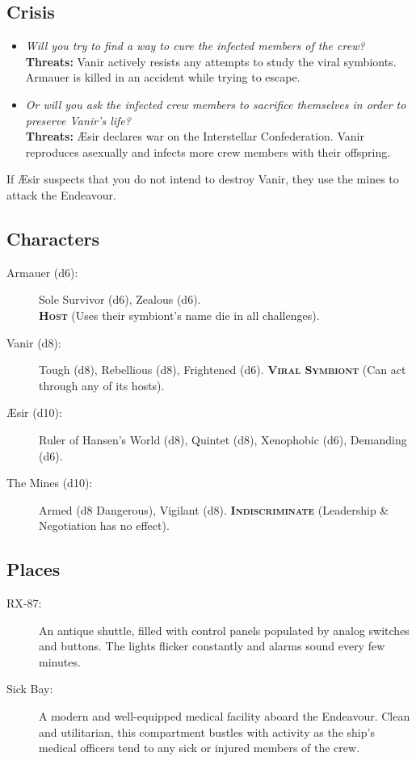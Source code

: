 \documentclass[11pt, a5paper, parskip=half-, DIV=12]{scrartcl}
\begin{document}
\subsection*{Crisis}

\begin{itemize}
	\item \textit{Will you try to find a way to cure the infected members of the crew?} \textbf{Threats:} Vanir actively resists any attempts to study the viral symbionts.  Armauer is killed in an accident while trying to escape.
	\item \textit{Or will you ask the infected crew members to sacrifice themselves in order to preserve Vanir's life?} \\ \textbf{Threats:} \AE{}sir declares war on the Interstellar Confederation. Vanir reproduces asexually and infects more crew members with their offspring.
\end{itemize}

If \AE{}sir suspects that you do not intend to destroy Vanir, they use the mines to attack the Endeavour.
\newpage

\subsection*{Characters}
\begin{description}
	\item[Armauer (d6):] Sole Survivor (d6), Zealous (d6). \\
	\textbf{\textsc{Host}} (Uses their symbiont's name die in all challenges).
	\item[Vanir (d8):] Tough (d8), Rebellious (d8), Frightened (d6). \textbf{\textsc{Viral Symbiont}} (Can act through any of its hosts).
	\item[\AE{}sir (d10):] Ruler of Hansen's World (d8), Quintet (d8), Xenophobic (d6), Demanding (d6).%
	\item[The Mines (d10):] Armed (d8 Dangerous), Vigilant (d8). \textbf{\textsc{Indiscriminate}} (Leadership \& Negotiation has no effect).
\end{description}

\subsection*{Places}
\begin{description}
	\item[RX-87:] An antique shuttle, filled with control panels populated by analog switches and buttons. The lights flicker constantly and alarms sound every few minutes.%
	\item[Sick Bay:] A modern and well-equipped medical facility aboard the Endeavour. Clean and utilitarian, this compartment bustles with activity as the ship's medical officers tend to any sick or injured members of the crew.
\end{description}
\end{document}
